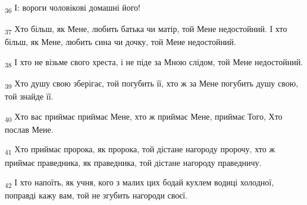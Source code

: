 \begin{tcolorbox}
\textsubscript{36} І: вороги чоловікові домашні його!
\end{tcolorbox}
\begin{tcolorbox}
\textsubscript{37} Хто більш, як Мене, любить батька чи матір, той Мене недостойний. І хто більш, як Мене, любить сина чи дочку, той Мене недостойний.
\end{tcolorbox}
\begin{tcolorbox}
\textsubscript{38} І хто не візьме свого хреста, і не піде за Мною слідом, той Мене недостойний.
\end{tcolorbox}
\begin{tcolorbox}
\textsubscript{39} Хто душу свою зберігає, той погубить її, хто ж за Мене погубить душу свою, той знайде її.
\end{tcolorbox}
\begin{tcolorbox}
\textsubscript{40} Хто вас приймає приймає Мене, хто ж приймає Мене, приймає Того, Хто послав Мене.
\end{tcolorbox}
\begin{tcolorbox}
\textsubscript{41} Хто приймає пророка, як пророка, той дістане нагороду пророчу, хто ж приймає праведника, як праведника, той дістане нагороду праведничу.
\end{tcolorbox}
\begin{tcolorbox}
\textsubscript{42} І хто напоїть, як учня, кого з малих цих бодай кухлем водиці холодної, поправді кажу вам, той не згубить нагороди своєї.
\end{tcolorbox}
